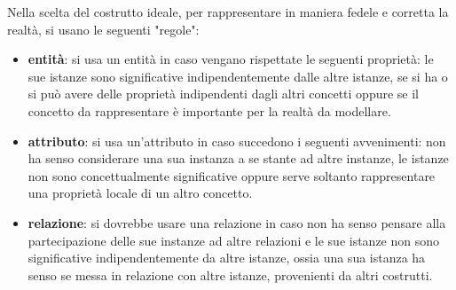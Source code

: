 \documentclass[a4paper,12pt, oneside]{book}
\begin{document}
Nella scelta del costrutto ideale, per rappresentare in maniera fedele e corretta la realtà, si usano le seguenti "regole":
\begin{itemize}
    \item \textbf{entità}: si usa un entità in caso vengano rispettate le seguenti proprietà: 
          le sue istanze sono significative indipendentemente dalle altre istanze, se si ha o si può avere delle proprietà
                indipendenti dagli altri concetti oppure se il concetto da rappresentare è importante per la realtà da modellare.
                
    \item \textbf{attributo}: si usa un'attributo in caso succedono i seguenti avvenimenti: non ha senso
            considerare una sua instanza a se stante ad altre instanze, le istanze non sono concettualmente significative
            oppure serve soltanto rappresentare una proprietà locale di un altro concetto.

    \item \textbf{relazione}: si dovrebbe usare una relazione in caso non ha senso pensare alla partecipazione
            delle sue instanze ad altre relazioni e le sue istanze non sono significative indipendentemente da altre istanze,
                ossia una sua istanza ha senso se messa in relazione con altre istanze, provenienti da altri costrutti.

\end{itemize}
\end{document}
